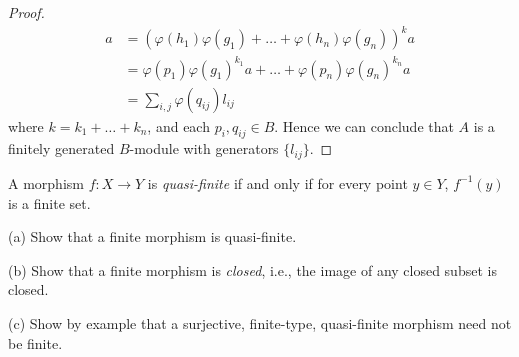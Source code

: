 \begin{proof}
	\begin{align*}
		a&=\left(\varphi(h_1)\varphi(g_1)+\dots+\varphi(h_n)\varphi(g_n)\right)^ka\\
		&=\varphi(p_1)\varphi(g_1)^{k_1}a+\dots+\varphi(p_n)\varphi(g_n)^{k_n}a\\
		&=\sum_{i,j}\varphi(q_{ij})l_{ij}
	\end{align*}
	where $k=k_1+\dots+k_n$, and each $p_i,q_{ij}\in B$. Hence we can conclude that $A$ is a finitely generated $B$-module with generators $\{l_{ij}\}$.
\end{proof}
\begin{exe}
	\label{2.3.5}
	A morphism $f:X\to Y$ is \emph{quasi-finite} if and only if for every point $y\in Y$, $f^{-1}(y)$ is a finite set.
	
	(a) Show that a finite morphism is quasi-finite.
	
	(b) Show that a finite morphism is \emph{closed}, i.e., the image of any closed subset is closed.
	
	(c) Show by example that a surjective, finite-type, quasi-finite morphism need not be finite.
\end{exe}
